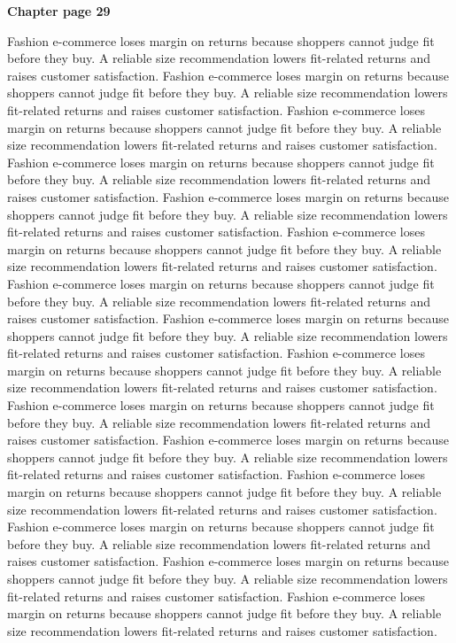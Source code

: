 \documentclass[a4paper,11pt]{article}
\begin{document}
{\headfont\bfseries\Large Chapter page 29}\par\medskip
Fashion e-commerce loses margin on returns because shoppers cannot judge fit before they buy. A reliable size recommendation lowers fit-related returns and raises customer satisfaction. Fashion e-commerce loses margin on returns because shoppers cannot judge fit before they buy. A reliable size recommendation lowers fit-related returns and raises customer satisfaction. Fashion e-commerce loses margin on returns because shoppers cannot judge fit before they buy. A reliable size recommendation lowers fit-related returns and raises customer satisfaction. Fashion e-commerce loses margin on returns because shoppers cannot judge fit before they buy. A reliable size recommendation lowers fit-related returns and raises customer satisfaction. Fashion e-commerce loses margin on returns because shoppers cannot judge fit before they buy. A reliable size recommendation lowers fit-related returns and raises customer satisfaction. 
Fashion e-commerce loses margin on returns because shoppers cannot judge fit before they buy. A reliable size recommendation lowers fit-related returns and raises customer satisfaction. Fashion e-commerce loses margin on returns because shoppers cannot judge fit before they buy. A reliable size recommendation lowers fit-related returns and raises customer satisfaction. Fashion e-commerce loses margin on returns because shoppers cannot judge fit before they buy. A reliable size recommendation lowers fit-related returns and raises customer satisfaction. Fashion e-commerce loses margin on returns because shoppers cannot judge fit before they buy. A reliable size recommendation lowers fit-related returns and raises customer satisfaction. Fashion e-commerce loses margin on returns because shoppers cannot judge fit before they buy. A reliable size recommendation lowers fit-related returns and raises customer satisfaction. 
Fashion e-commerce loses margin on returns because shoppers cannot judge fit before they buy. A reliable size recommendation lowers fit-related returns and raises customer satisfaction. Fashion e-commerce loses margin on returns because shoppers cannot judge fit before they buy. A reliable size recommendation lowers fit-related returns and raises customer satisfaction. Fashion e-commerce loses margin on returns because shoppers cannot judge fit before they buy. A reliable size recommendation lowers fit-related returns and raises customer satisfaction. Fashion e-commerce loses margin on returns because shoppers cannot judge fit before they buy. A reliable size recommendation lowers fit-related returns and raises customer satisfaction. Fashion e-commerce loses margin on returns because shoppers cannot judge fit before they buy. A reliable size recommendation lowers fit-related returns and raises customer satisfaction. \newpage
\end{document}
